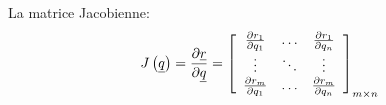 La matrice Jacobienne:
\begin{equation}
J\left( \underline{q} \right) = \frac{\partial \underline{r}}{\partial \underline{q}} = 
\left[ \begin{array}{c c c} 
\frac{\partial r_1 }{\partial q_1}   &  \hdots & \frac{\partial r_1 }{\partial q_n} \\ 
\vdots                               &  \ddots & \vdots                             \\
\frac{\partial r_m }{\partial q_1}   &  \hdots & \frac{\partial r_m }{\partial q_n}
\end{array} \right]_{m \times n}
\end{equation}
